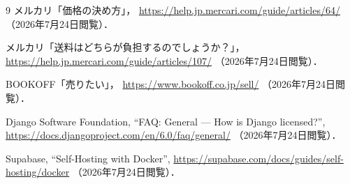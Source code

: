 \documentclass[11pt,a4paper]{jsarticle}
\begin{document}
\begin{thebibliography}{9}
    メルカリ「価格の決め方」，
    \url{https://help.jp.mercari.com/guide/articles/64/}
    （2026年7月24日閲覧）．

    メルカリ「送料はどちらが負担するのでしょうか？」，
    \url{https://help.jp.mercari.com/guide/articles/107/}
    （2026年7月24日閲覧）．

    BOOKOFF「売りたい」，
    \url{https://www.bookoff.co.jp/sell/}
    （2026年7月24日閲覧）．

    Django Software Foundation, ``FAQ: General --- How is Django licensed?'',
    \url{https://docs.djangoproject.com/en/6.0/faq/general/}
    （2026年7月24日閲覧）．

    Supabase, ``Self-Hosting with Docker'',
    \url{https://supabase.com/docs/guides/self-hosting/docker}
    （2026年7月24日閲覧）．
\end{thebibliography}
\end{document}
